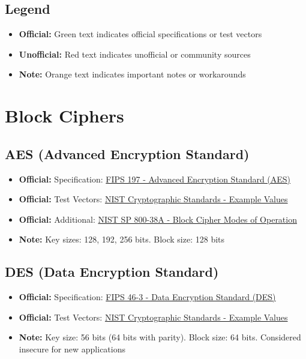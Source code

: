 \documentclass[12pt,a4paper]{article}
\newcommand{\official}[1]{\textcolor{citegreen}{\textbf{Official:}} #1}
\newcommand{\unofficial}[1]{\textcolor{warningred}{\textbf{Unofficial:}} #1}
\newcommand{\note}[1]{\textcolor{noteorange}{\textbf{Note:}} #1}
\newcommand{\link}[2]{\href{#1}{#2}}
\begin{document}
\subsection{Legend}
\begin{itemize}
    \item \official{Green text} indicates official specifications or test vectors
    \item \unofficial{Red text} indicates unofficial or community sources
    \item \note{Orange text} indicates important notes or workarounds
\end{itemize}

\newpage

\section{Block Ciphers}

\subsection{AES (Advanced Encryption Standard)}
\begin{itemize}
    \item \official{Specification:} \link{https://nvlpubs.nist.gov/nistpubs/FIPS/NIST.FIPS.197.pdf}{FIPS 197 - Advanced Encryption Standard (AES)}
    \item \official{Test Vectors:} \link{https://csrc.nist.gov/Projects/cryptographic-standards-and-guidelines/example-values}{NIST Cryptographic Standards - Example Values}
    \item \official{Additional:} \link{https://nvlpubs.nist.gov/nistpubs/SpecialPublications/NIST.SP.800-38A.pdf}{NIST SP 800-38A - Block Cipher Modes of Operation}
    \item \note{Key sizes: 128, 192, 256 bits. Block size: 128 bits}
\end{itemize}

\subsection{DES (Data Encryption Standard)}
\begin{itemize}
    \item \official{Specification:} \link{https://nvlpubs.nist.gov/nistpubs/FIPS/NIST.FIPS.46-3.pdf}{FIPS 46-3 - Data Encryption Standard (DES)}
    \item \official{Test Vectors:} \link{https://csrc.nist.gov/Projects/cryptographic-standards-and-guidelines/example-values}{NIST Cryptographic Standards - Example Values}
    \item \note{Key size: 56 bits (64 bits with parity). Block size: 64 bits. Considered insecure for new applications}
\end{itemize}
\end{document}
